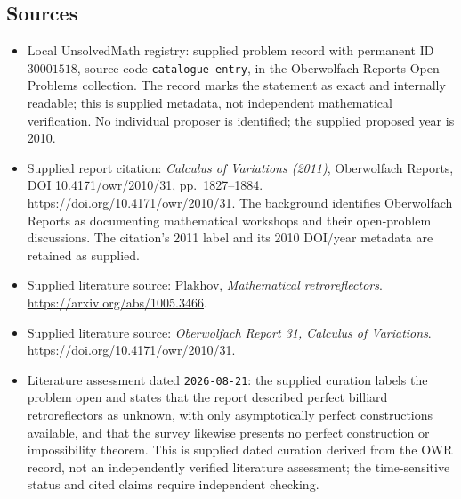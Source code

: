 \documentclass[11pt]{article}
\begin{document}
\subsection{Sources}
\begin{itemize}
\item Local UnsolvedMath registry: supplied problem record with permanent ID \(30001518\), source code \texttt{catalogue entry}, in the Oberwolfach Reports Open Problems collection. The record marks the statement as exact and internally readable; this is supplied metadata, not independent mathematical verification. No individual proposer is identified; the supplied proposed year is 2010.
\item Supplied report citation: \emph{Calculus of Variations (2011)}, Oberwolfach Reports, DOI 10.4171/owr/2010/31, pp.~1827--1884. \url{https://doi.org/10.4171/owr/2010/31}. The background identifies Oberwolfach Reports as documenting mathematical workshops and their open-problem discussions. The citation's 2011 label and its 2010 DOI/year metadata are retained as supplied.
\item Supplied literature source: Plakhov, \emph{Mathematical retroreflectors}. \url{https://arxiv.org/abs/1005.3466}.
\item Supplied literature source: \emph{Oberwolfach Report 31, Calculus of Variations}. \url{https://doi.org/10.4171/owr/2010/31}.
\item Literature assessment dated \texttt{2026-08-21}: the supplied curation labels the problem open and states that the report described perfect billiard retroreflectors as unknown, with only asymptotically perfect constructions available, and that the survey likewise presents no perfect construction or impossibility theorem. This is supplied dated curation derived from the OWR record, not an independently verified literature assessment; the time-sensitive status and cited claims require independent checking.
\end{itemize}
\end{document}
